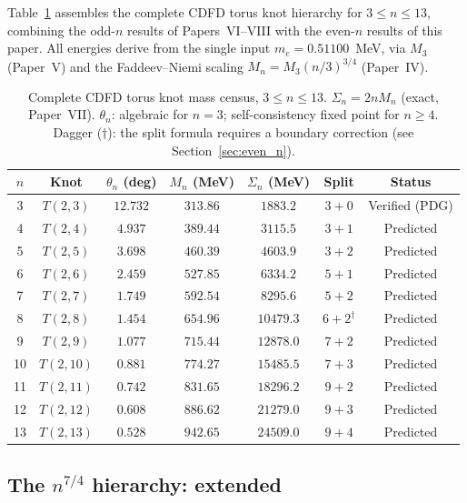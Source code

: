 \documentclass[11pt]{article}
\begin{document}
Table~\ref{tab:full_census} assembles the complete CDFD torus knot
hierarchy for $3 \leq n \leq 13$, combining the odd-$n$ results of
Papers~VI--VIII with the even-$n$ results of this paper.
All energies derive from the single input $m_e = 0.51100$~MeV, via
$M_3$ (Paper~V) and the Faddeev--Niemi scaling $M_n = M_3(n/3)^{3/4}$
(Paper~IV).

\begin{table}[ht]
  \caption{Complete CDFD torus knot mass census, $3 \leq n \leq 13$.
    $\Sigma_n = 2nM_n$ (exact, Paper~VII).
    $\theta_n$: algebraic for $n=3$; self-consistency fixed point for $n \geq 4$.
    Dagger ($\dagger$): the split formula requires a boundary correction (see Section~\ref{sec:even_n}).}
  \label{tab:full_census}
  \begin{tabular}{ccccccc}
    \toprule
    $n$ & Knot & $\theta_n$ (deg) & $M_n$ (MeV) & $\Sigma_n$ (MeV) & Split & Status \\
    \midrule
    3  & $T(2,3)$  & $12.732$ & $313.86$ & $1883.2$  & $3+0$ & Verified (PDG) \\
    4  & $T(2,4)$  & $4.937$  & $389.44$ & $3115.5$  & $3+1$ & Predicted \\
    5  & $T(2,5)$  & $3.698$  & $460.39$ & $4603.9$  & $3+2$ & Predicted \\
    6  & $T(2,6)$  & $2.459$  & $527.85$ & $6334.2$  & $5+1$ & Predicted \\
    7  & $T(2,7)$  & $1.749$  & $592.54$ & $8295.6$  & $5+2$ & Predicted \\
    8  & $T(2,8)$  & $1.454$  & $654.96$ & $10479.3$ & $6+2^\dagger$ & Predicted \\
    9  & $T(2,9)$  & $1.077$  & $715.44$ & $12878.0$ & $7+2$ & Predicted \\
    10 & $T(2,10)$ & $0.881$  & $774.27$ & $15485.5$ & $7+3$ & Predicted \\
    11 & $T(2,11)$ & $0.742$  & $831.65$ & $18296.2$ & $9+2$ & Predicted \\
    12 & $T(2,12)$ & $0.608$  & $886.62$ & $21279.0$ & $9+3$ & Predicted \\
    13 & $T(2,13)$ & $0.528$  & $942.65$ & $24509.0$ & $9+4$ & Predicted \\
    \bottomrule
  \end{tabular}
\end{table}

\subsection{The $n^{7/4}$ hierarchy: extended}
\end{document}
